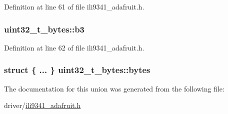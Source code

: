 Definition at line 61 of file ili9341\-\_\-adafruit.\-h.

\hypertarget{unionuint32__t__bytes_abd7739cae59fab7cf712d53f337b378a}{
\subsubsection[{b3}]{ uint32\-\_\-t\-\_\-bytes\-::b3}}\label{unionuint32__t__bytes_abd7739cae59fab7cf712d53f337b378a}


Definition at line 62 of file ili9341\-\_\-adafruit.\-h.

\hypertarget{unionuint32__t__bytes_a50aeebe398ee3b740421f1cc8d8583b8}{
\subsubsection[{bytes}]{\setlength{\rightskip}{0pt plus 5cm}struct \{ ... \}   uint32\-\_\-t\-\_\-bytes\-::bytes}}\label{unionuint32__t__bytes_a50aeebe398ee3b740421f1cc8d8583b8}


The documentation for this union was generated from the following file\-:\begin{DoxyCompactItemize}
\item 
driver/\hyperlink{ili9341__adafruit_8h}{ili9341\-\_\-adafruit.\-h}\end{DoxyCompactItemize}
